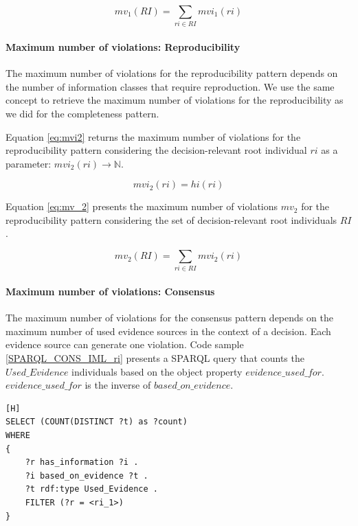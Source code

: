 \begin{equation} \label{eq:mv_1}
mv_1(RI) = \sum_{ri \in RI} mvi_1(ri)
\end{equation}

\paragraph{Maximum number of violations: Reproducibility}
The maximum number of violations for the reproducibility pattern depends on the number of information classes that require reproduction. We use the same concept to retrieve the maximum number of violations for the reproducibility as we did for the completeness pattern. 

Equation \ref{eq:mvi2} returns the maximum number of violations for the reproducibility pattern considering the decision-relevant root individual $ri$ as a parameter: $mvi_2(ri) \rightarrow \mathbb{N}$.

\begin{equation} \label{eq:mvi2}
mvi_2(ri) = hi(ri)
\end{equation}

Equation \ref{eq:mv_2} presents the maximum number of violations $mv_2$ for the reproducibility pattern considering the set of decision-relevant root individuals $RI$. 

\begin{equation} \label{eq:mv_2}
mv_2(RI) = \sum_{ri \in RI} mvi_2(ri)
\end{equation}

\paragraph{Maximum number of violations: Consensus}
The maximum number of violations for the consensus pattern depends on the maximum number of used evidence sources in the context of a decision. Each evidence source can generate  one violation. Code sample \ref{SPARQL_CONS_IML_ri} presents a SPARQL query that counts the $Used\_Evidence$ individuals based on the object property $evidence\_used\_for$. $evidence\_used\_for$ is the inverse of $based\_on\_evidence$. 

\begin{lstlisting}[float,language=SPARQL1,caption={The SPARQL query that retrieves the number of individuals that the reasoner classified as $Used\_Evidence$ in the context of a specific root class.},label={SPARQL_CONS_IML_ri}][H]
SELECT (COUNT(DISTINCT ?t) as ?count) 
WHERE 
{
	?r has_information ?i .
	?i based_on_evidence ?t .
	?t rdf:type Used_Evidence .
	FILTER (?r = <ri_1>)
}
\end{lstlisting}

